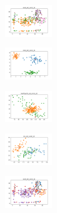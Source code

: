\begin{figure}[H]
    \begin{subfigure}
        \centering
        \includegraphics[width=0.234\textwidth]{img/aggun/ecoli_set_const_10_277451237_clust.png}
    \end{subfigure}
    \hfill
    \begin{subfigure}
        \centering
        \includegraphics[width=0.234\textwidth]{img/aggun/rand_set_const_10_277451237_clust.png}
    \end{subfigure}
    \hfill
    \begin{subfigure}
        \centering
        \includegraphics[width=0.234\textwidth]{img/aggun/newthyroid_set_const_10_277451237_clust.png}
    \end{subfigure}
    \hfill
    \begin{subfigure}
        \centering
        \includegraphics[width=0.234\textwidth]{img/aggun/iris_set_const_10_49258669_clust.png}
    \end{subfigure}
    \hfill
    \begin{subfigure}
        \centering
        \includegraphics[width=0.234\textwidth]{img/aggun/ecoli_set_const_10_49258669_clust.png}
    \end{subfigure}
    \hfill
    \begin{subfigure}
        \centering

\end{subfigure}
\end{figure}
